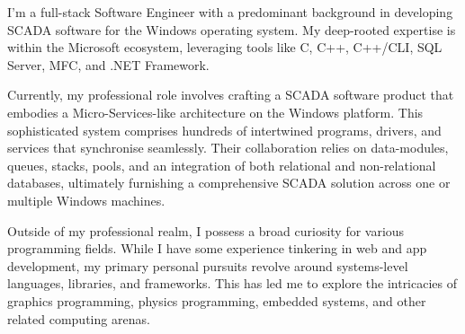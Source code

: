 \documentclass[9pt]{developercv} %
\begin{document}
\vspace{0.5cm}


\begin{minipage}[t]{0.6\textwidth} %


	I'm a full-stack Software Engineer with a predominant background in developing SCADA software for the Windows operating system. My deep-rooted expertise is within the Microsoft ecosystem, leveraging tools like C, C++, C++/CLI, SQL Server, MFC, and .NET Framework.

	\vspace{0.5cm}	

	Currently, my professional role involves crafting a SCADA software product that embodies a Micro-Services-like architecture on the Windows platform. This sophisticated system comprises hundreds of intertwined programs, drivers, and services that synchronise seamlessly. Their collaboration relies on data-modules, queues, stacks, pools, and an integration of both relational and non-relational databases, ultimately furnishing a comprehensive SCADA solution across one or multiple Windows machines.
	
	\vspace{0.5cm}	

	Outside of my professional realm, I possess a broad curiosity for various programming fields. While I have some experience tinkering in web and app development, my primary personal pursuits revolve around systems-level languages, libraries, and frameworks. This has led me to explore the intricacies of graphics programming, physics programming, embedded systems, and other related computing arenas.

\end{minipage}
\hfill %
\begin{minipage}[t]{0.5\textwidth} %


	\begin{barchart}{5.5}
	\end{barchart}

\end{minipage}
\end{document}

